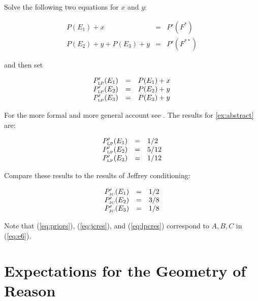 \documentclass[12pt]{article}
\begin{document}
Solve the following two equations for $x$ and $y$:

\begin{equation}
  \label{eq:lpce}
  \begin{array}{rcl}
    P(E_{1})+x&=&P'(F^{*}) \\
    P(E_{2})+y+P(E_{3})+y&=&P'(F^{**})
  \end{array}
\end{equation}

and then set

\begin{equation}
  \label{eq:lpcf}
  \begin{array}{rcl}
    P'_{\mbox{\tiny LP}}(E_{1})&=&P(E_{1})+x \\
    P'_{\mbox{\tiny LP}}(E_{2})&=&P(E_{2})+y \\
    P'_{\mbox{\tiny LP}}(E_{3})&=&P(E_{3})+y
  \end{array}
\end{equation}

For the more formal and more general account see
. The results for {\xample}
\ref{ex:abstract} are:

\begin{equation}
  \label{eq:lpcres}
  \begin{array}{rcl}
    P'_{\mbox{\tiny LP}}(E_{1})&=&1/2 \\
    P'_{\mbox{\tiny LP}}(E_{2})&=&5/12 \\
    P'_{\mbox{\tiny LP}}(E_{3})&=&1/12
  \end{array}
\end{equation}

Compare these results to the results of Jeffrey conditioning:

\begin{equation}
  \label{eq:jcres}
  \begin{array}{rcl}
    P'_{\mbox{\tiny JC}}(E_{1})&=&1/2 \\
    P'_{\mbox{\tiny JC}}(E_{2})&=&3/8 \\
    P'_{\mbox{\tiny JC}}(E_{3})&=&1/8
  \end{array}
\end{equation}

Note that (\ref{eq:priors}), (\ref{eq:jcres}), and (\ref{eq:lpcres})
correspond to $A,B,C$ in (\ref{eq:e6}). 

\section{Expectations for the Geometry of Reason}
\label{fivex}
\end{document}
